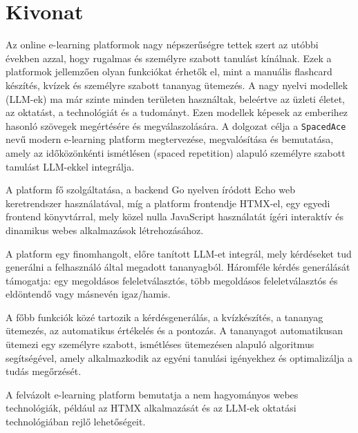 \setcounter{page}{1}

\selecthungarian

\chapter*{Kivonat}

Az online e-learning platformok nagy népszerűségre tettek szert az utóbbi években azzal, hogy rugalmas és személyre szabott tanulást kínálnak. Ezek a platformok jellemzően olyan funkciókat érhetők el, mint a manuális flashcard készítés, kvízek és személyre szabott tananyag ütemezés. A nagy nyelvi modellek (LLM-ek) ma már szinte minden területen használtak, beleértve az üzleti életet, az oktatást, a technológiát és a tudományt. Ezen modellek képesek az emberihez hasonló szövegek megértésére és megválaszolására. A dolgozat célja a \texttt{SpacedAce} nevű modern e-learning platform megtervezése, megvalósítása és bemutatása, amely az időközönkénti ismétlésen (spaced repetition) alapuló személyre szabott tanulást LLM-ekkel integrálja.

A platform fő szolgáltatása, a backend Go nyelven íródott Echo web keretrendszer használatával, míg a platform frontendje HTMX-el, egy egyedi frontend könyvtárral, mely közel nulla JavaScript használatát ígéri interaktív és dinamikus webes alkalmazások létrehozásához.

A platform egy finomhangolt, előre tanított LLM-et integrál, mely kérdéseket tud generálni a felhasználó által megadott tananyagból. Háromféle kérdés generálását támogatja: egy megoldásos feleletválasztós, több megoldásos feleletválasztós és eldöntendő vagy másnevén igaz/hamis.

A főbb funkciók közé tartozik a kérdésgenerálás, a kvízkészítés, a tananyag ütemezés, az automatikus értékelés és a pontozás. A tananyagot automatikusan ütemezi egy személyre szabott, ismétléses ütemezésen alapuló algoritmus segítségével, amely alkalmazkodik az egyéni tanulási igényekhez és optimalizálja a tudás megőrzését.

A felvázolt e-learning platform bemutatja a nem hagyományos webes technológiák, például az HTMX alkalmazását és az LLM-ek oktatási technológiában rejlő lehetőségeit.

\vfill
\selectenglish



